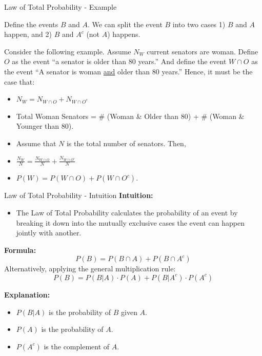 \documentclass[handout]{beamer} %
\begin{document}
\begin{frame}{Law of Total Probability - Example}
   
Define the events $B$ and $A$. We can split the event $B$ into two cases 1) $B$ and $A$ happen, and 2) $B$ and $A^c$ (not $A$) happens.  \newline
\vspace{0.5em}


Consider the following example. Assume $N_W$ current senators are woman. Define $O$ as the event ``a senator is older than 80 years.'' And define the event $W \cap O$ as the event ``A senator is woman \underline{and} older than 80 years.'' Hence, it must be the case that:
\begin{itemize}
    \item $N_W = N_{W\cap O} + N_{W\cap O^c}$
    \item Total Woman Senators = \# (Woman \& Older than 80) + \# (Woman \& Younger than 80).
    \item Assume that $N$ is the total number of senators. Then,
    \item $\frac{N_W}{N} = \frac{N_{W\cap O}}{N}+ \frac{N_{W\cap O^c}}{N}$
    \item $P(W) = P(W \cap O) + P(W \cap O^c)$. 
\end{itemize}
\end{frame}


\begin{frame}{Law of Total Probability - Intuition}
    \textbf{Intuition:} \pause
    \begin{itemize}
        \item The Law of Total Probability calculates the probability of an event by breaking it down into the mutually exclusive cases the event can happen jointly with another.\pause
    \end{itemize}

    \textbf{Formula:}
    $$  P(B) = P(B \cap A) + P(B\cap A^c)  $$
    Alternatively, applying the general multiplication rule:
    $$ P(B) = P(B|A) \cdot P(A) + P(B|A^c) \cdot P(A^c) $$
    \pause

    \textbf{Explanation:}\pause
    \begin{itemize}
        \item \(P(B|A)\) is the probability of \(B\) given \(A\).\pause
        \item \(P(A)\) is the probability of \(A\).\pause
        \item \(P(A^c)\) is the complement of \(A\).
    \end{itemize}
\end{frame}
\end{document}
